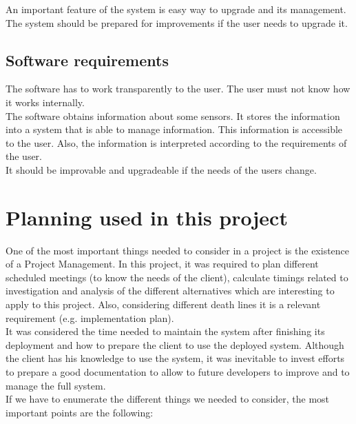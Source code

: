 An important feature of the system is easy way to upgrade and its management. The system should be prepared for improvements if the user needs to upgrade it.

\subsection{Software requirements}

The software has to work transparently to the user. The user must not know how it works internally.\\

The software obtains information about some sensors. It stores the information into a system that is able to manage information. This information is accessible to the user. Also, the information is interpreted according to the requirements of the user.\\

It should be improvable and upgradeable if the needs of the users change.

\section{Planning used in this project}

One of the most important things needed to consider in a project is the existence of a Project Management. In this project, it was required to plan different scheduled meetings (to know the needs of the client), calculate timings related to investigation and analysis of the different alternatives which are interesting to apply to this project. Also, considering different death lines it is a relevant requirement (e.g. implementation plan).\\

It was considered the time needed to maintain the system after finishing its deployment and how to prepare the client to use the deployed system. Although the client has his knowledge to use the system, it was inevitable to invest efforts to prepare a good documentation to allow to future developers to improve and to manage the full system.\\

If we have to enumerate the different things we needed to consider, the most important points are the following:

